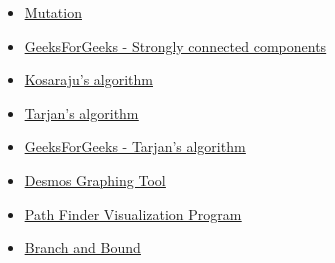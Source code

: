 \documentclass[article, a4paper, 12pt, oneside]{memoir}
\begin{document}
\begin{itemize}
	\item \color{blue} \underline{\href{https://en.wikipedia.org/wiki/Mutation}{Mutation}} \color{black}
	\item \color{blue} \underline{\href{https://www.geeksforgeeks.org/strongly-connected-components}{GeeksForGeeks - Strongly connected components}} \color{black}
	\item \color{blue} \underline{\href{https://en.wikipedia.org/wiki/Kosaraju\%27s_algorithm}{Kosaraju's algorithm}} \color{black}
	\item \color{blue} \underline{\href{https://en.wikipedia.org/wiki/Tarjan\%27s_strongly_connected_components_algorithm}{Tarjan's algorithm}} \color{black}
	\item \color{blue} \underline{\href{https://www.geeksforgeeks.org/tarjan-algorithm-find-strongly-connected-components}{GeeksForGeeks - Tarjan's algorithm}} \color{black}
	\item \color{blue} \underline{\href{https://www.desmos.com/calculator}{Desmos Graphing Tool}} \color{black}
	\item \color{blue} \underline{\href{https://github.com/kevinwang1975/PathFinder}{Path Finder Visualization Program}} \color{black}
	\item \color{blue} \underline{\href{ https://en.wikipedia.org/wiki/Branch_and_bound}{Branch and Bound}} \color{black}
\end{itemize}
\end{document}
